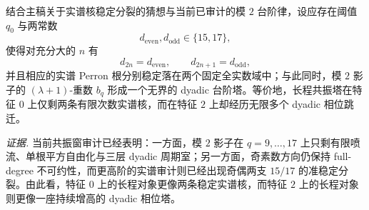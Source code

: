 \begin{conjecture}\label{conj:conclusion-resonance-window-two-real-cores-unbounded-dyadic-tower}
结合主稿关于实谱核稳定分裂的猜想与当前已审计的模 \(2\) 台阶律，设应存在阈值 \(q_0\) 与两常数
\[
d_{\mathrm{even}},d_{\mathrm{odd}}\in\{15,17\},
\]
使得对充分大的 \(n\) 有
\[
d_{2n}=d_{\mathrm{even}},
\qquad
d_{2n+1}=d_{\mathrm{odd}},
\]
并且相应的实谱 Perron 根分别稳定落在两个固定全实数域中；与此同时，模 \(2\) 影子的 \((\lambda+1)\)-重数 \(b_q\) 形成一个无界的 dyadic 台阶塔。等价地，长程共振塔在特征 \(0\) 上仅剩两条有限次数实谱核，而在特征 \(2\) 上却经历无限多个 dyadic 相位跳迁。
\end{conjecture}

\noindent\emph{证据.}
当前共振窗审计已经表明：一方面，模 \(2\) 影子在 \(q=9,\dots,17\) 上只剩有限喷流、单根平方自由化与三层 dyadic 周期室；另一方面，奇素数方向仍保持 full-degree 不可约性，而更高阶的实谱审计则已经出现奇偶两支 \(15/17\) 的准稳定分裂。由此看，特征 \(0\) 上的长程对象更像两条稳定实谱核，而特征 \(2\) 上的长程对象则更像一座持续增高的 dyadic 相位塔。
